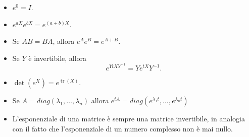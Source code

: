 \documentclass{article}
\theoremstyle{definition}
\newcommand{\la}{\lambda}
\begin{document}
\begin{itemize}
	\item \( e^0 = I \).
	
	\item \( e^{aX}e^{bX} = e^{(a+b)X} \).
	
	
	\item Se \( AB = BA \), allora \( e^Ae^B = e^{A+B} \).
	
	\item Se \( Y \) è invertibile, allora 
	\[
	e^{YtXY^{-1}} = Ye^{tX}Y^{-1}.
	\]
	
	\item \(\det(e^X) = e^{\operatorname{tr}(X)} \).
	
\item Se $A=diag(\la_1,\dots,\la_n)$ allora $e^{tA}=diag(e^{\la_1 t},\dots , e^{\la_n t})$
	
	\item L'esponenziale di una matrice è sempre una matrice invertibile, in analogia con il fatto che l'esponenziale di un numero complesso non è mai nullo.
\end{itemize}
\end{document}
